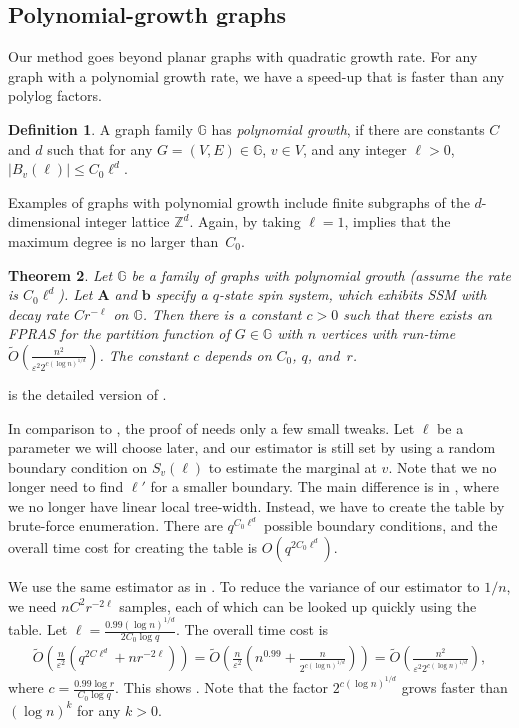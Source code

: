 \documentclass[11pt]{amsart}
\def\=#1{\mathbb{#1}}
\newcommand{\abs}[1]{\ensuremath{\left\vert#1\right\vert}}
\newcommand{\eps}{\varepsilon}
\newtheorem{theorem}{Theorem}
\theoremstyle{definition}
\newtheorem{definition}[theorem]{Definition}
\theoremstyle{remark}
\begin{document}
\subsection{Polynomial-growth graphs} \label{sec:poly-growth}

Our method goes beyond planar graphs with quadratic growth rate.
For any graph with a polynomial growth rate, we have a speed-up that is faster than any polylog factors.

\begin{definition}  \label{def:poly-growth}
  A graph family $\=G$ has \emph{polynomial growth},
  if there are constants $C$ and $d$ such that for any $G=(V,E)\in\=G$, $v\in V$, and any integer $\ell>0$,
  $\abs{B_v(\ell)}\le C_0\ell^d$.
\end{definition}

Examples of graphs with polynomial growth include finite subgraphs of the $d$-dimensional integer lattice $\=Z^d$.
Again, by taking $\ell=1$,  implies that the maximum degree is no larger than~$C_0$.

\begin{theorem} \label{thm:polylog}
  Let $\=G$ be a family of graphs with polynomial growth (assume the rate is $C_0\ell^d$).
  Let ${\bm A}$ and ${\bm b}$ specify a $q$-state spin system, which exhibits SSM with decay rate $Cr^{-\ell}$ on $\=G$.
  Then there is a constant $c>0$ such that there exists an FPRAS for the partition function of $G\in\=G$ with $n$ vertices with run-time $\widetilde{O}\left(\frac{n^2}{\eps^2 2^{c(\log n)^{1/d}}}\right)$.
  The constant $c$ depends on $C_0$, $q$, and~$r$.
\end{theorem}

 is the detailed version of .

In comparison to ,
the proof of  needs only a few small tweaks.
Let $\ell$ be a parameter we will choose later,
and our estimator is still set by using a random boundary condition on $S_v(\ell)$ to estimate the marginal at $v$.
Note that we no longer need to find $\ell'$ for a smaller boundary.
The main difference is in ,
where we no longer have linear local tree-width.
Instead, we have to create the table by brute-force enumeration.
There are $q^{C_0\ell^d}$ possible boundary conditions,
and the overall time cost for creating the table is $O(q^{2C_0\ell^d})$.

We use the same estimator as in .
To reduce the variance of our estimator to $1/n$, we need $nC^2r^{-2\ell}$ samples,
each of which can be looked up quickly using the table.
Let $\ell=\frac{0.99(\log n)^{1/d}}{2C_0\log q}$.
The overall time cost is
\begin{align*}
  \widetilde{O}\left( \frac{n}{\eps^2}\left( q^{2C\ell^d}+ nr^{-2\ell}\right) \right)
  =\widetilde{O}\left( \frac{n}{\eps^2}\left(n^{0.99}+\frac{n}{2^{c(\log n)^{1/d}}}\right) \right)
  =\widetilde{O}\left(\frac{n^2}{\eps^2 2^{c(\log n)^{1/d}}}\right),
\end{align*}
where $c=\frac{0.99\log r}{C_0\log q}$.
This shows .
Note that the factor $2^{c(\log n)^{1/d}}$ grows faster than $(\log n)^k$ for any $k>0$.
\end{document}
